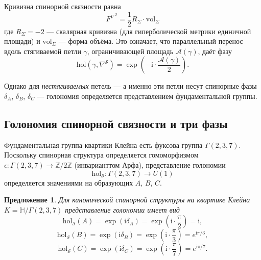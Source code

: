 \documentclass[12pt,a4paper]{article}
\newtheorem{proposition}[theorem]{Предложение}
\theoremstyle{definition}
\theoremstyle{remark}
\newcommand{\ZZ}{\mathbb{Z}}
\newcommand{\HH}{\mathbb{H}}
\newcommand{\hol}{\mathrm{hol}}
\newcommand{\cS}{\mathcal{S}}
\newcommand{\ii}{\mathrm{i}}
\begin{document}
Кривизна спинорной связности равна
\begin{equation}
F^{\nabla^{\cS}} = \frac{1}{2} R_{\Sigma} \cdot \mathrm{vol}_{\Sigma}
\end{equation}
где $R_{\Sigma} = -2$ --- скалярная кривизна (для гиперболической метрики единичной площади) и $\mathrm{vol}_{\Sigma}$ --- форма объёма. Это означает, что параллельный перенос вдоль стягиваемой петли $\gamma$, ограничивающей площадь $\mathcal{A}(\gamma)$, даёт фазу
\begin{equation}
\hol(\gamma, \nabla^{\cS}) = \exp\left(-\ii \cdot \frac{\mathcal{A}(\gamma)}{2}\right).
\end{equation}

Однако для \emph{нестягиваемых} петель --- а именно эти петли несут спинорные фазы $\delta_A$, $\delta_B$, $\delta_C$ --- голономия определяется представлением фундаментальной группы.

\subsection{Голономия спинорной связности и три фазы}

Фундаментальная группа квартики Клейна есть фуксова группа $\Gamma(2,3,7)$. Поскольку спинорная структура определяется гомоморфизмом $\epsilon \colon \Gamma(2,3,7) \to \ZZ/2\ZZ$ (инварианттом Арфа), представление голономии
\begin{equation}
\hol_{\cS} \colon \Gamma(2,3,7) \to U(1)
\end{equation}
определяется значениями на образующих $A$, $B$, $C$.

\begin{proposition}
Для канонической спинорной структуры на квартике Клейна $K = \HH/\Gamma(2,3,7)$ представление голономии имеет вид
\begin{equation}
\hol_{\cS}(A) = \exp(\ii \delta_A) = \exp\left(\ii \cdot \frac{\pi}{2}\right) = \ii,
\end{equation}
\begin{equation}
\hol_{\cS}(B) = \exp(\ii \delta_B) = \exp\left(\ii \cdot \frac{\pi}{3}\right) = e^{\ii\pi/3},
\end{equation}
\begin{equation}
\hol_{\cS}(C) = \exp(\ii \delta_C) = \exp\left(\ii \cdot \frac{\pi}{7}\right) = e^{\ii\pi/7}.
\end{equation}
\end{proposition}
\end{document}
